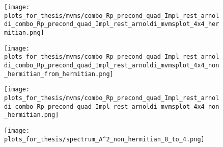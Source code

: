 \begin{figure}[H]
    \centering
    \begin{minipage}{0.45\textwidth}
        \centering
        \texttt{[image: plots\_for\_thesis/mvms/combo\_Rp\_precond\_quad\_Impl\_rest\_arnoldi\_combo\_Rp\_precond\_quad\_Impl\_rest\_arnoldi\_mvmsplot\_4x4\_hermitian.png]} %
    \end{minipage}%
    \hspace{0.02\textwidth} %
    \begin{minipage}{0.45\textwidth}
        \centering
        \texttt{[image: plots\_for\_thesis/mvms/combo\_Rp\_precond\_quad\_Impl\_rest\_arnoldi\_combo\_Rp\_precond\_quad\_Impl\_rest\_arnoldi\_mvmsplot\_4x4\_non\_hermitian\_from\_hermitian.png]} %
    \end{minipage}
    
    \vspace{0.02\textwidth} %
    
    \begin{minipage}{0.45\textwidth}
        \centering
        \texttt{[image: plots\_for\_thesis/mvms/combo\_Rp\_precond\_quad\_Impl\_rest\_arnoldi\_combo\_Rp\_precond\_quad\_Impl\_rest\_arnoldi\_mvmsplot\_4x4\_non\_hermitian.png]} %
    \end{minipage}%
    \hspace{0.02\textwidth} %
    \begin{minipage}{0.45\textwidth}
        \centering
        \texttt{[image: plots\_for\_thesis/spectrum\_A^2\_non\_hermitian\_8\_to\_4.png]} %
    \end{minipage}
    

\end{figure}
